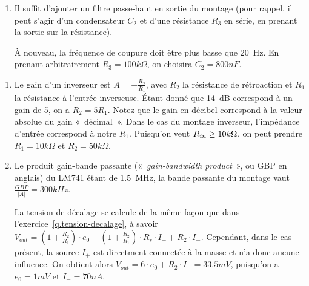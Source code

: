 \documentclass{../template/tp}
\begin{document}
{\begin{enumerate}
		En prenant arbitrairement $R_1 = 1k\Omega$, on a $R_2 = 100k\Omega$, et donc $C >> 8 \mu F$.
		En pratique, un à deux ordres de grandeur suffisent~: prenons $C = 80 \mu F$.

		\item Il suffit d'ajouter un filtre passe-haut en sortie du montage (pour rappel, il peut s'agir d'un condensateur $C_2$ et d'une résistance $R_3$ en série, en prenant la sortie sur la résistance).

		À nouveau, la fréquence de coupure doit être plus basse que 20~Hz.
		En prenant arbitrairement $R_3 = 100 k\Omega$, on choisira $C_2 = 800 nF$.
	\end{enumerate}
}

{
	\begin{enumerate}
		\item Le gain d'un inverseur est $A = -\frac{R_2}{R_1}$, avec $R_2$ la résistance de rétroaction et $R_1$ la résistance à l'entrée inverseuse.
		Étant donné que 14~dB correspond à un gain de 5, on a $R_2 = 5 R_1$. Notez que le gain en décibel correspond à la valeur absolue du gain «~décimal~».
		Dans le cas du montage inverseur, l'impédance d'entrée correspond à notre $R_1$.
		Puisqu'on veut $R_{in} \geq 10 k\ohm$, on peut prendre $R_1 = 10 k\Omega$ et $R_2 = 50 k\Omega$.

		\item Le produit gain-bande passante («~\textit{gain-bandwidth product}~», ou GBP en anglais) du LM741 étant de 1.5~MHz, la bande passante du montage vaut $\frac{GBP}{|A|} = 300 kHz$.

		La tension de décalage se calcule de la même façon que dans l'exercice~\ref{q.tension-decalage}, à savoir $V_{out} = (1+\frac{R_2}{R_1})\cdot e_0 -(1+\frac{R_2}{R_1}) \cdot R_s \cdot I_+ + R_2 \cdot I_-$.
		Cependant, dans le cas présent, la source $I_+$ est directment connectée à la masse et n'a donc aucune influence.
		On obtient alors $V_{out} = 6\cdot e_0 + R_2 \cdot I_- = 33.5 mV$, puisqu'on a $e_0 = 1mV$ et $I_- = 70nA$.
	\end{enumerate}
}
\end{document}
